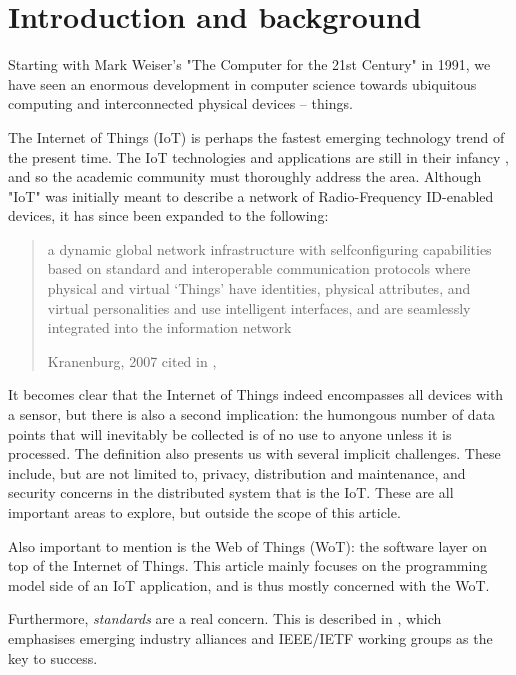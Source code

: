 \section{Introduction and background}
Starting with \nocite{weiser:the-computer-for-the-21st-century:1991}Mark Weiser's "The Computer for the 21st Century" in 1991, we have seen an enormous development in computer science towards ubiquitous computing and interconnected physical devices -- things.

The Internet of Things (IoT) is perhaps the fastest emerging technology trend of the present time. The IoT technologies and applications are still in their infancy \autocite{xu-he-li:internet-of-things-in-industries-a-survery:2014}, and so the academic community must thoroughly address the area. Although "IoT" was initially meant to describe a network of Radio-Frequency ID-enabled devices, it has since been expanded to the following:

\blockquote[{Kranenburg, 2007 cited in \citeauthor{xu-he-li:internet-of-things-in-industries-a-survery:2014}, \citeyear[1]{xu-he-li:internet-of-things-in-industries-a-survery:2014}}]{a dynamic global network infrastructure with selfconfiguring capabilities based on standard and interoperable communication protocols where physical and virtual ‘Things’ have identities, physical attributes, and virtual personalities and use intelligent interfaces, and are seamlessly integrated into the information network}.

It becomes clear that the Internet of Things indeed encompasses all devices with a sensor, but there is also a second implication: the humongous number of data points that will inevitably be collected is of no use to anyone unless it is processed. The definition also presents us with several implicit challenges. These include, but are not limited to, privacy, distribution and maintenance, and security concerns in the distributed system that is the IoT. These are all important areas to explore, but outside the scope of this article.

Also important to mention is the Web of Things (WoT): the software layer on top of the Internet of Things. This article mainly focuses on the programming model side of an IoT application, and is thus mostly concerned with the WoT.

Furthermore, \textit{standards} are a real concern. This is described in \textcite{palattella-accettura-vilajosana-watteyne-gieco-boggia-dohler:standardized-protocol-stack-for-the-internet-of-important-things:2012}, which emphasises emerging industry alliances and IEEE/IETF working groups as the key to success.

